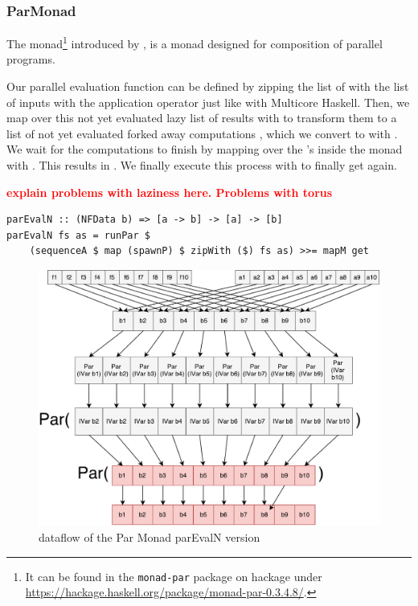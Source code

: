 \subsubsection{ParMonad}
The  monad\footnote{It can be found in the \texttt{monad-par} package on hackage under \url{https://hackage.haskell.org/package/monad-par-0.3.4.8/}.} introduced by \citet{monad_par_paper_2011}, is a monad designed for composition of parallel programs.


Our parallel evaluation function  can be defined by zipping the list of \code{[a -> b]} with the list of inputs \code{[a]} with the application operator \code{\$} just like with Multicore Haskell. Then, we map over this not yet evaluated lazy list of results \code{[b]} with  to transform them to a list of not yet evaluated forked away computations , which we convert to  with . We wait for the computations to finish by mapping over the 's inside the  monad with . This results in . We finally execute this process with  to finally get \code{[b]} again.

\textbf{\textcolor{red}{explain problems with laziness here. Problems with torus}}

\begin{lstlisting}[frame=htrbl]
parEvalN :: (NFData b) => [a -> b] -> [a] -> [b]
parEvalN fs as = runPar $ 
	(sequenceA $ map (spawnP) $ zipWith ($) fs as) >>= mapM get
\end{lstlisting}
\begin{figure}[h]
	\includegraphics[scale=0.5]{images/parEvalNParMonad}
	\caption{dataflow of the Par Monad parEvalN version}
\end{figure}

